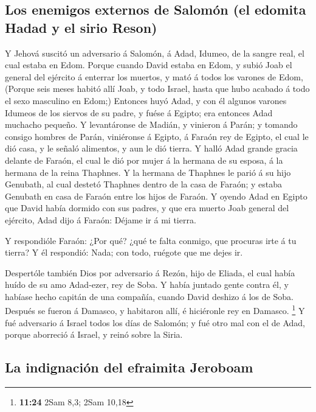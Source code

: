 \hypertarget{los-enemigos-externos-de-salomuxf3n-el-edomita-hadad-y-el-sirio-reson}{%
\subsection{Los enemigos externos de Salomón (el edomita Hadad y el
sirio
Reson)}\label{los-enemigos-externos-de-salomuxf3n-el-edomita-hadad-y-el-sirio-reson}}

 Y Jehová suscitó un adversario á Salomón, á Adad, Idumeo,
de la sangre real, el cual estaba en Edom.  Porque cuando
David estaba en Edom, y subió Joab el general del ejército á enterrar
los muertos, y mató á todos los varones de Edom,  (Porque
seis meses habitó allí Joab, y todo Israel, hasta que hubo acabado á
todo el sexo masculino en Edom;)  Entonces huyó Adad, y con
él algunos varones Idumeos de los siervos de su padre, y fuése á Egipto;
era entonces Adad muchacho pequeño.  Y levantáronse de
Madián, y vinieron á Parán; y tomando consigo hombres de Parán,
viniéronse á Egipto, á Faraón rey de Egipto, el cual le dió casa, y le
señaló alimentos, y aun le dió tierra.  Y halló Adad grande
gracia delante de Faraón, el cual le dió por mujer á la hermana de su
esposa, á la hermana de la reina Thaphnes.  Y la hermana de
Thaphnes le parió á su hijo Genubath, al cual destetó Thaphnes dentro de
la casa de Faraón; y estaba Genubath en casa de Faraón entre los hijos
de Faraón.  Y oyendo Adad en Egipto que David había dormido
con sus padres, y que era muerto Joab general del ejército, Adad dijo á
Faraón: Déjame ir á mi tierra.

 Y respondióle Faraón: ¿Por qué? ¿qué te falta conmigo, que
procuras irte á tu tierra? Y él respondió: Nada; con todo, ruégote que
me dejes ir.

 Despertóle también Dios por adversario á Rezón, hijo de
Eliada, el cual había huído de su amo Adad-ezer, rey de Soba.
 Y había juntado gente contra él, y habíase hecho capitán
de una compañía, cuando David deshizo á los de Soba. Después se fueron á
Damasco, y habitaron allí, é hiciéronle rey en Damasco. \footnote{\textbf{11:24}
  2Sam 8,3; 2Sam 10,18}  Y fué adversario á Israel todos
los días de Salomón; y fué otro mal con el de Adad, porque aborreció á
Israel, y reinó sobre la Siria.

\hypertarget{la-indignaciuxf3n-del-efraimita-jeroboam}{%
\subsection{La indignación del efraimita
Jeroboam}\label{la-indignaciuxf3n-del-efraimita-jeroboam}}

